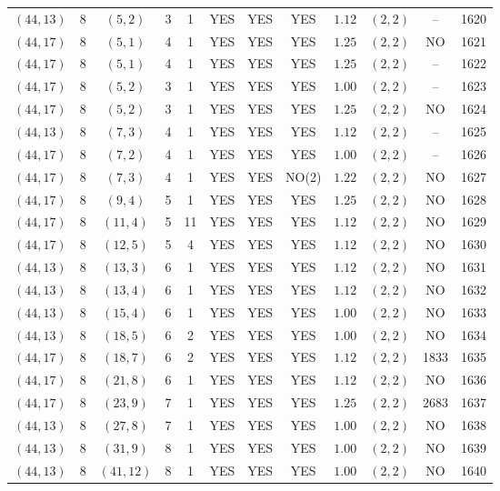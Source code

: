 \begin{longtable}{|c|c|c|c|c|c|c|c|c|c|c|c|}
$(44,13)$ & 8 & $(5,2)$ & 3 & 1 & YES & YES & YES & $1.12$ & $(2,2)$ & -- & 1620\\
$(44,17)$ & 8 & $(5,1)$ & 4 & 1 & YES & YES & YES & $1.25$ & $(2,2)$ & NO & 1621\\
$(44,17)$ & 8 & $(5,1)$ & 4 & 1 & YES & YES & YES & $1.25$ & $(2,2)$ & -- & 1622\\
$(44,17)$ & 8 & $(5,2)$ & 3 & 1 & YES & YES & YES & $1.00$ & $(2,2)$ & -- & 1623\\
$(44,17)$ & 8 & $(5,2)$ & 3 & 1 & YES & YES & YES & $1.25$ & $(2,2)$ & NO & 1624\\
$(44,13)$ & 8 & $(7,3)$ & 4 & 1 & YES & YES & YES & $1.12$ & $(2,2)$ & -- & 1625\\
$(44,17)$ & 8 & $(7,2)$ & 4 & 1 & YES & YES & YES & $1.00$ & $(2,2)$ & -- & 1626\\
$(44,17)$ & 8 & $(7,3)$ & 4 & 1 & YES & YES & NO(2) & $1.22$ & $(2,2)$ & NO & 1627\\
$(44,17)$ & 8 & $(9,4)$ & 5 & 1 & YES & YES & YES & $1.25$ & $(2,2)$ & NO & 1628\\
$(44,17)$ & 8 & $(11,4)$ & 5 & 11 & YES & YES & YES & $1.12$ & $(2,2)$ & NO & 1629\\
$(44,17)$ & 8 & $(12,5)$ & 5 & 4 & YES & YES & YES & $1.12$ & $(2,2)$ & NO & 1630\\
$(44,13)$ & 8 & $(13,3)$ & 6 & 1 & YES & YES & YES & $1.12$ & $(2,2)$ & NO & 1631\\
$(44,13)$ & 8 & $(13,4)$ & 6 & 1 & YES & YES & YES & $1.12$ & $(2,2)$ & NO & 1632\\
$(44,13)$ & 8 & $(15,4)$ & 6 & 1 & YES & YES & YES & $1.00$ & $(2,2)$ & NO & 1633\\
$(44,13)$ & 8 & $(18,5)$ & 6 & 2 & YES & YES & YES & $1.00$ & $(2,2)$ & NO & 1634\\
$(44,17)$ & 8 & $(18,7)$ & 6 & 2 & YES & YES & YES & $1.12$ & $(2,2)$ & 1833 & 1635\\
$(44,17)$ & 8 & $(21,8)$ & 6 & 1 & YES & YES & YES & $1.12$ & $(2,2)$ & NO & 1636\\
$(44,17)$ & 8 & $(23,9)$ & 7 & 1 & YES & YES & YES & $1.25$ & $(2,2)$ & 2683 & 1637\\
$(44,13)$ & 8 & $(27,8)$ & 7 & 1 & YES & YES & YES & $1.00$ & $(2,2)$ & NO & 1638\\
$(44,13)$ & 8 & $(31,9)$ & 8 & 1 & YES & YES & YES & $1.00$ & $(2,2)$ & NO & 1639\\
$(44,13)$ & 8 & $(41,12)$ & 8 & 1 & YES & YES & YES & $1.00$ & $(2,2)$ & NO & 1640\\

\end{longtable}

